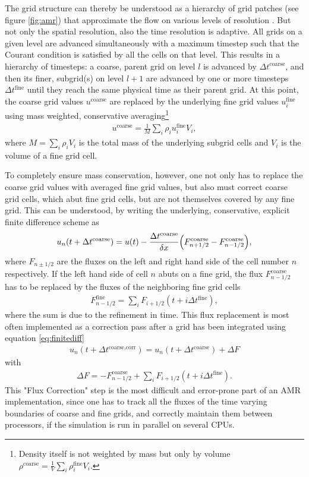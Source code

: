 The grid structure can thereby
be understood as a hierarchy of grid patches (see figure \ref{fig:amr}) that
approximate the flow on various levels of resolution
\citep{Berger1984,Berger1989}. But not only the spatial resolution, also
the time resolution is adaptive. All grids on
a given level are advanced simultaneously with a
maximum timestep such that the Courant condition is
satisfied by all the cells on that level. This results in
a hierarchy of timesteps: a coarse, parent grid on level $l$ is advanced by
$\Delta t^{\text{coarse}}$, and then its finer, subgrid(s) on level $l + 1$ are
advanced by one or more timesteps $\Delta t^{\text{fine}}$ until they reach
the same physical time as their parent grid. 
At this point, the coarse grid values $u^{\text{coarse}}$ are replaced by the
underlying fine grid values $u_i^{\text{fine}}$ using mass weighted,
conservative averaging\footnote{Density itself is not weighted by mass but only
by volume $\rho^{\text{coarse}}=\frac{1}{V}\sum_i \rho_i^{\text{fine}} V_i$.} 
\begin{align}
u^{\text{coarse}}=\frac{1}{M}\sum_i \rho_i u_i^{\text{fine}} V_i,
\end{align}
where $M=\sum_i \rho_i V_i$ is the total mass of the underlying subgrid cells
and $V_i$ is the volume of a fine grid cell. 

To completely ensure mass conservation, however, one not only has to replace the
coarse grid values with averaged fine grid values, but also must correct
coarse grid cells, which abut fine grid cells, but are not themselves
covered by any fine grid. This can be understood, by writing the underlying, 
conservative, explicit finite difference scheme as
\begin{align}
u_n(t+\Delta t^{\text{coarse}}) = u(t) 
- \frac{\Delta t^{\text{coarse}}}{\delta x}
{ \left( F^{\text{coarse}}_{n+1/2}-F^{\text{coarse}}_{n-1/2} \right) },\label{eq:finitediff}
\end{align}
where $F_{n \pm 1/2}$ are the fluxes on the left and right hand
side of the cell number $n$ respectively. If the left hand side of cell $n$
abuts on a fine grid, the flux $F^{\text{coarse}}_{n-1/2}$ has to be replaced
by the fluxes of the neighboring fine grid cells
\begin{align}
F^{\text{fine}}_{n-1/2}=\sum_i F_{i+1/2}(t+i \Delta t^{\text{fine}}),
\end{align}
where the sum is due to the refinement in time. This flux replacement is most
often implemented as a correction pass after a grid has been integrated using 
equation \ref{eq:finitediff}
\begin{align}
u_n(t+\Delta t^{\text{coarse,corr}}) = 
u_n(t+\Delta t^{\text{coarse}}) + \Delta F
\end{align}
with 
\begin{align}
\Delta F = -F^{\text{coarse}}_{n-1/2}+
\sum_i F_{i+1/2}(t+i \Delta t^{\text{fine}}).
\end{align}
This "Flux Correction" step is the most difficult and error-prone part of an
AMR implementation, since one has to track all the fluxes of the time varying
boundaries of coarse and fine grids, and correctly maintain them between
processors, if the simulation is run in parallel on several CPUs.   

